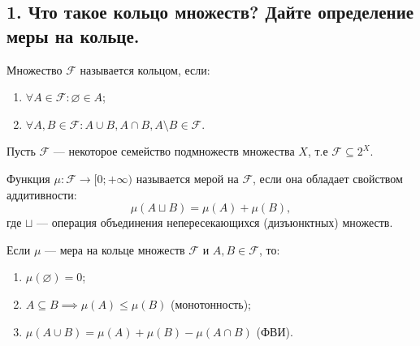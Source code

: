 
\subsection*{1. Что такое кольцо множеств? Дайте определение меры на кольце.}
    
    \begin{definition}[Маевский]
        Множество $\mathcal{F}$ называется кольцом, если:\\[-25 pt]
        \begin{enumerate}
            \item $\forall A \in \mathcal{F} : \varnothing \in A$;
            \item $\forall A,  B \in \mathcal{F} : A \cup B, A \cap B, A \setminus B \in \mathcal{F}$.
        \end{enumerate}
    \end{definition}

    \begin{definition}
        Пусть $\mathcal{F}$ --- некоторое семейство подмножеств множества $X$, 
        т.е $\mathcal{F} \subseteq 2^X$.
        
        Функция $\mu : \mathcal{F} \to [0; +\infty)$ называется мерой на $\mathcal{F}$, 
        если она обладает свойством аддитивности:
        \[ \mu(A \sqcup B) = \mu(A) + \mu(B), \]
        где $\sqcup$ --- операция объединения непересекающихся (дизъюнктных) множеств.
    \end{definition}
        
    \begin{properties}
        Если $\mu$ --- мера на кольце множеств $\mathcal{F}$ и $A, B \in \mathcal{F}$, то:\\[-25 pt]
        \begin{enumerate}
            \item $\mu(\varnothing) = 0$;
            \item $A \subseteq B \implies \mu(A) \le \mu(B)$ (монотонность);
            \item $\mu(A \cup B) = \mu(A) + \mu(B) - \mu(A \cap B)$ (ФВИ).
        \end{enumerate}
    \end{properties}
